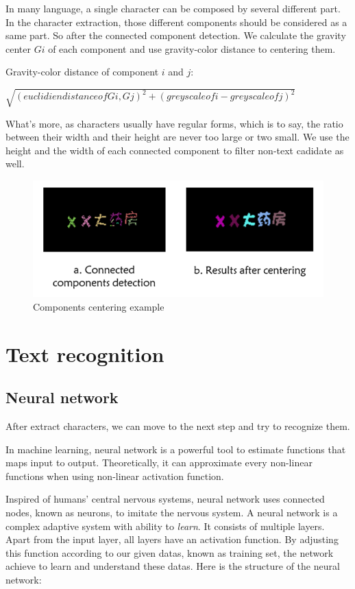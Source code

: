 \documentclass[paper=a4, french, 11pt]{scrartcl}
\begin{document}
In many language, a single character can be composed by several different part. In the character extraction, those different components should be considered as a same part. So after the connected component detection. We calculate the gravity center $G{i}$ of each component and use gravity-color distance to centering them.

Gravity-color distance of component $ i$ and $ j$:

$\sqrt{(euclidien distance of G{i}, G{j})^2 + (greyscale of i - greyscale of j)^2}$

What's more, as characters usually have regular forms, which is to say, the ratio between their width and their height are never too large or two small. We use the height and the width of each connected component to filter non-text cadidate as well. 

\begin{figure}[h]
\begin{center}
   \includegraphics[width=0.9\linewidth]{component_centering_example.png}
\end{center}
\vspace{-4ex}
\caption{Components centering example}
\label{fig:heatmap}
\end{figure}

\section{Text recognition}
\subsection{Neural network}
After extract characters, we can move to the next step and try to recognize them.

In machine learning, neural network is a powerful tool to estimate functions that maps input to output. Theoretically, it can approximate every non-linear functions when using non-linear activation function. 

Inspired of humans' central nervous systems, neural network uses connected nodes, known as neurons, to imitate the nervous system. A neural network is a complex adaptive system with ability to \textit{learn}. It consists of multiple layers. Apart from the input layer, all layers have an activation function. By adjusting this function according to our given datas, known as training set, the network achieve to learn and understand these datas. Here is the structure of the neural network:
\end{document}
